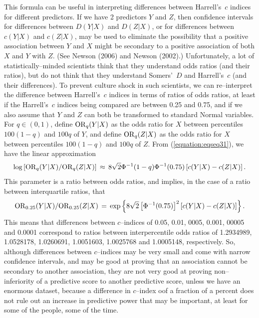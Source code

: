 \documentclass[a4paper,notitlepage]{article}      %
\begin{document}
This formula can be useful in interpreting differences between Harrell's~$c$ indices for different predictors.
If we have 2 predictors $Y$ and $Z$,
then confidence intervals for differences between $D(Y|X)$ and $D(Z|X)$,
or for differences between $c(Y|X)$ and $c(Z|X)$,
may be used to eliminate the possibility that a positive association between $Y$ and $X$ might be secondary
to a positive association of both $X$ and $Y$ with $Z$.
(See Newson (2006)\cite{newson2006} and Newson (2002)\cite{newson2002}.)
Unfortunately, a lot of statistically--minded scientists think that they understand odds ratios (and their ratios),
but do not think that they understand Somers'~$D$ and Harrell's~$c$ (and their differences).
To prevent culture shock in such scientists,
we can re--interpret the difference between Harrell's~$c$ indices in terms of ratios of odds ratios,
at least if the Harrell's~$c$ indices being compared are between 0.25 and 0.75,
and if we also assume that $Y$ and $Z$ can both be transformed to standard Normal variables.
For $q \in (0,1)$,
define ${\rm OR}_q(Y|X)$ as the odds ratio for $X$ between percentiles $100(1-q)$ and $100q$ of $Y$,
and define ${\rm OR}_q(Z|X)$ as the odds ratio for $X$ between percentiles $100(1-q)$ and $100q$ of $Z$.
From (\ref{equation:eqseq31}), we have the linear approximation
\begin{equation}
\log \left[ {\rm OR}_q(Y|X) / {\rm OR}_q(Z|X) \right] \, \approx \,
8 \sqrt{2} \Phi^{-1}(1-q) \Phi^{-1}(0.75) \left[ c(Y|X) - c(Z|X) \right] .
\label{equation:eqseq32}
\end{equation}
This parameter is a ratio between odds ratios, and implies, in the case of a ratio between interquartile ratios, that
\begin{equation}
{\rm OR}_{0.25}(Y|X)/{\rm OR}_{0.25}(Z|X) \, = \, \exp \left\{ 8 \sqrt{2} \left[ \Phi^{-1}(0.75) \right]^2 \left[ c(Y|X) - c(Z|X) \right] \right\} .
\label{equation:eqseq33}
\end{equation}
This means that differences between $c$--indices of 0.05, 0.01, 0005, 0.001, 00005 and 0.0001
correspond to ratios between interpercentile odds ratios of  1.2934989,  1.0528178, 1.0260691, 1.0051603, 1.0025768 and 1.0005148,
respectively.
So, although differences between $c$--indices may be very small and come with narrow confidence intervals,
and may be good at proving that an association cannot be secondary to another association,
they are not very good at proving non--inferiority of a predictive score to another predictive score,
unless we have an enormous dataset,
because a difference in $c$--index oof a fraction of a percent
does not rule out an increase in predictive power that may be important,
at least for some of the people, some of the time.
\end{document}
